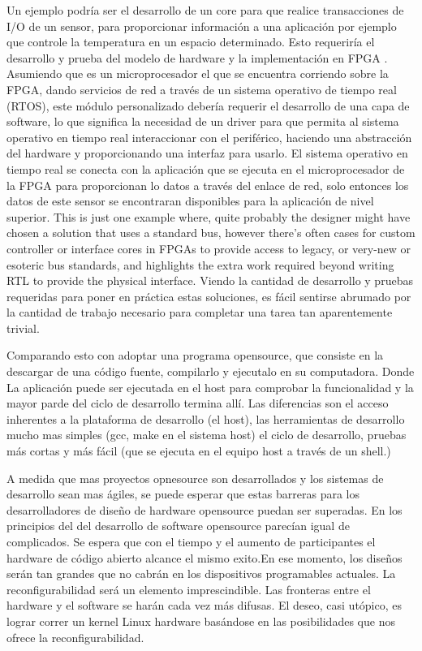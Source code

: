 Un ejemplo podría ser el desarrollo de un core para que realice transacciones de I/O de un sensor, para proporcionar información a una aplicación por ejemplo que controle la temperatura en un espacio determinado. Esto requeriría el desarrollo y prueba del modelo de hardware y la implementación en FPGA . Asumiendo que es un microprocesador el que se encuentra corriendo sobre la FPGA, dando servicios de red a través de un sistema operativo de tiempo real (RTOS), este módulo personalizado debería requerir el desarrollo de una capa de software, lo que significa la necesidad de un driver para que permita al sistema operativo en tiempo real interaccionar con el periférico, haciendo una abstracción del hardware y proporcionando una interfaz para usarlo. El sistema operativo en tiempo real se conecta con la aplicación que se ejecuta en el microprocesador de la FPGA para proporcionan lo datos a través del enlace de red, solo entonces los datos de este sensor se encontraran disponibles para la aplicación de nivel superior. This is just one example where, quite probably the designer might have chosen a solution that uses a standard bus, however there’s often cases for custom controller or interface cores in FPGAs to provide
access to legacy, or very-new or esoteric bus standards, and highlights the extra work required beyond writing RTL to provide the physical interface.
Viendo la cantidad de desarrollo y pruebas requeridas para poner en práctica estas soluciones, es fácil sentirse abrumado por la cantidad de trabajo necesario para completar una tarea tan aparentemente trivial.

Comparando esto con adoptar una programa opensource, que consiste en la descargar de una código fuente, compilarlo y ejecutalo en su computadora. Donde La aplicación puede ser ejecutada en el  host para comprobar la funcionalidad y la mayor parde del ciclo de desarrollo termina allí. Las diferencias son el acceso inherentes a la plataforma de desarrollo (el host), las herramientas de desarrollo mucho mas simples (gcc, make en el sistema host) el ciclo de desarrollo, pruebas más cortas y más fácil (que se ejecuta en el equipo host a través de un shell.)

A medida que mas proyectos opnesource son desarrollados y los sistemas de desarrollo sean mas ágiles, se puede esperar que estas barreras para los desarrolladores de diseño de hardware opensource puedan ser superadas. En los principios del del desarrollo de software opensource parecían igual de complicados. Se espera que con el tiempo y el aumento de participantes el hardware de código abierto alcance el mismo exito.En ese momento, los diseños serán tan grandes que no cabrán en los dispositivos programables actuales. La reconfigurabilidad será un elemento imprescindible. Las fronteras entre el hardware y el software se harán cada vez más difusas. El deseo, casi utópico, es lograr correr un kernel Linux hardware basándose en las posibilidades que nos ofrece la reconfigurabilidad. 
	

